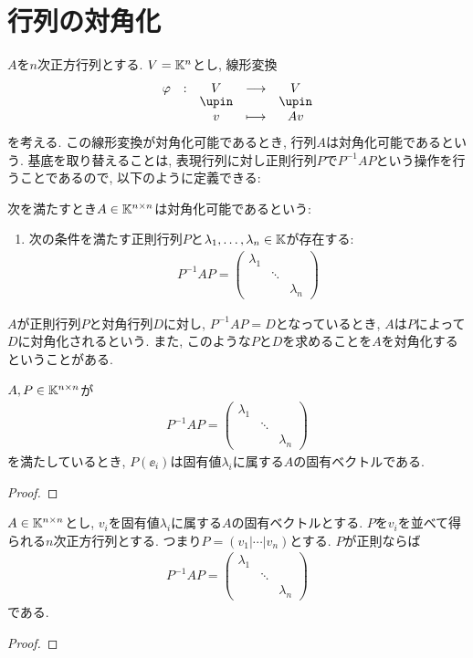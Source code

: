 \section{行列の対角化}
$A$を$n$次正方行列とする.
$V=\mathbb{K}^n$とし, 線形変換
\begin{align*}
  \shazo{\varphi}{V}{V}
  {v}{Av}
\end{align*}
を考える.
この線形変換が対角化可能であるとき,
行列$A$は対角化可能であるという.
基底を取り替えることは,
表現行列に対し正則行列$P$で$P^{-1}AP$という操作を行うことであるので,
以下のように定義できる:
\begin{definition}
  次を満たすとき$A\in \mathbb{K}^{n\times n}$は対角化可能であるという:
  \begin{enumerate}
  \item 次の条件を満たす正則行列$P$と$\lambda_1,\ldots,\lambda_n\in\mathbb{K}$が存在する:
    \begin{align*}
      P^{-1}AP=
      \begin{pmatrix}\lambda_1&&\\&\ddots&\\&&\lambda_n\end{pmatrix}
    \end{align*}
  \end{enumerate}
\end{definition}
\begin{remark}
  $A$が正則行列$P$と対角行列$D$に対し, $P^{-1}AP=D$となっているとき,
  $A$は$P$によって$D$に対角化されるという.
  また, このような$P$と$D$を求めることを$A$を対角化するということがある.
\end{remark}

\begin{lemma}
  $A,P\in\mathbb{K}^{n\times n}$が
    \begin{align*}
      P^{-1}AP=
      \begin{pmatrix}\lambda_1&&\\&\ddots&\\&&\lambda_n\end{pmatrix}
    \end{align*}
    を満たしているとき,
    $P(\ee_i)$は固有値$\lambda_i$に属する$A$の固有ベクトルである.
\end{lemma}
\begin{proof}\end{proof}

\begin{lemma}
  $A\in\mathbb{K}^{n\times n}$とし,
  $v_i$を固有値$\lambda_i$に属する$A$の固有ベクトルとする.
  $P$を$v_i$を並べて得られる$n$次正方行列とする.
  つまり$P=(v_1|\cdots | v_n)$とする.
  $P$が正則ならば
    \begin{align*}
      P^{-1}AP=
      \begin{pmatrix}\lambda_1&&\\&\ddots&\\&&\lambda_n\end{pmatrix}
    \end{align*}
    である.
\end{lemma}
\begin{proof}\end{proof}


